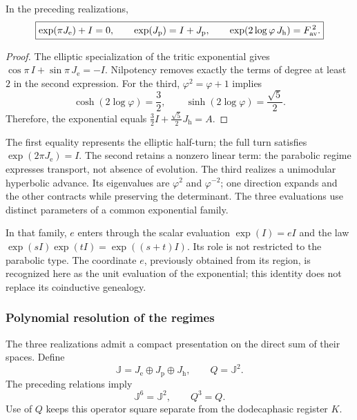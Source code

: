 \begin{proposition}
\label{x_reciprocidad:euler-trit-evaluaciones}
In the preceding realizations,
\begin{equation}
 \boxed{
 \exp(\pi J_{\mathrm e})+I=0,\qquad
 \exp(J_{\mathrm p})=I+J_{\mathrm p},\qquad
 \exp(2\log\varphi\,J_{\mathrm h})=F_{\rm av}^{\,2}.}
 \label{x_reciprocidad:euler-trit-tres-evaluaciones}
\end{equation}
\end{proposition}
\begin{proof}
The elliptic specialization of the tritic exponential gives
\(\cos\pi\,I+\sin\pi\,J_{\mathrm e}=-I\).
Nilpotency removes exactly the terms of degree at least \(2\)
in the second expression. For the third, \(\varphi^2=\varphi+1\) implies
\[
 \cosh(2\log\varphi)=\frac32,\qquad
 \sinh(2\log\varphi)=\frac{\sqrt5}{2}.
\]
Therefore, the exponential equals
\(\frac32I+\frac{\sqrt5}{2}J_{\mathrm h}=A\).
\end{proof}

The first equality represents the elliptic half-turn; the full turn
satisfies \(\exp(2\pi J_{\mathrm e})=I\). The second retains a nonzero linear
term: the parabolic regime expresses transport, not absence of
evolution. The third realizes a unimodular hyperbolic advance. Its
eigenvalues are \(\varphi^2\) and \(\varphi^{-2}\); one direction expands and
the other contracts while preserving the determinant. The three evaluations
use distinct parameters of a common exponential family.

In that family, \(e\) enters through the scalar evaluation
\(\exp(I)=eI\) and the law \(\exp(sI)\exp(tI)=\exp((s+t)I)\).
Its role is not restricted to the parabolic type. The coordinate \(e\), previously
obtained from its region, is recognized here as the unit evaluation
of the exponential; this identity does not replace its coinductive genealogy.

\subsubsection{Polynomial resolution of the regimes}

The three realizations admit a compact presentation on the direct sum
of their spaces. Define
\[
 \mathbb J=J_{\mathrm e}\oplus J_{\mathrm p}\oplus J_{\mathrm h},
 \qquad Q=\mathbb J^2.
\]
The preceding relations imply
\[
 \mathbb J^6=\mathbb J^2,\qquad Q^3=Q.
\]
Use of \(Q\) keeps this operator square separate from the dodecaphasic
register \(K\).


